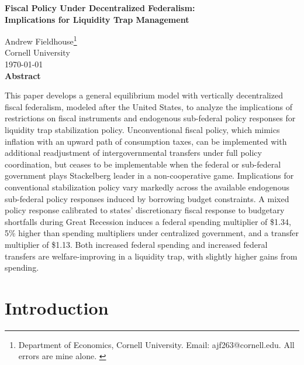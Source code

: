 \documentclass[12pt,letterpaper]{article}
\begin{document}
\begin{center} {\Large \textbf{Fiscal Policy Under Decentralized Federalism: \\}} \smallskip
{\large {\textbf{Implications for Liquidity Trap Management}}} \\ \bigskip
\end{center}
\begin{center} Andrew Fieldhouse\footnote{Department of Economics, Cornell University. Email: ajf263@cornell.edu. All errors are mine alone. \label{fnlabel}}  \\ \smallskip
Cornell University \\ \bigskip
\today \\ \bigskip \bigskip
\textbf{Abstract} \\ \smallskip
\end{center}

This paper develops a general equilibrium model with vertically decentralized fiscal federalism, modeled after the United States, to analyze the implications of restrictions on fiscal instruments and endogenous sub-federal policy responses for liquidity trap stabilization policy. Unconventional fiscal policy, which mimics inflation with an upward path of consumption taxes, can be implemented with additional readjustment of intergovernmental transfers under full policy coordination, but ceases to be implementable when the federal or sub-federal government plays Stackelberg leader in a non-cooperative game. Implications for conventional stabilization policy vary markedly across the available endogenous sub-federal policy responses induced by borrowing budget constraints. A mixed policy response calibrated to states' discretionary fiscal response to budgetary shortfalls during Great Recession induces a federal spending multiplier of \$1.34, 5\% higher than spending multipliers under centralized government, and a transfer multiplier of \$1.13. Both increased federal spending and increased federal transfers are welfare-improving in a liquidity trap, with slightly higher gains from spending. \bigskip \bigskip \bigskip \bigskip \bigskip \bigskip \bigskip \bigskip \bigskip \bigskip \bigskip \bigskip \bigskip \bigskip

\pagebreak

\section{Introduction}

\renewcommand{\thefootnote}{\arabic{footnote}}
\setcounter{footnote}{0}
\end{document}
